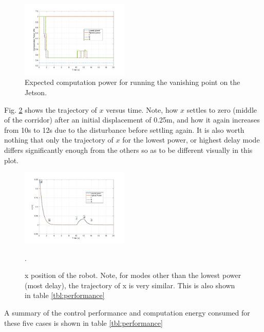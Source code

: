 \begin{figure}[hbtp]
\centering
\includegraphics[width=0.46\textwidth]{../simulations/figs/power.pdf}
\caption{Expected computation power for running the vanishing point on the Jetson.}
\label{fig:power} 
\end{figure}

Fig. \ref{fig:xvst} shows the trajectory of $x$ versus time. Note, how $x$ settles to zero (middle of the corridor) after an initial displacement of 0.25m, and how it again increases from 10s to 12s due to the disturbance before settling again. It is also worth nothing that only the trajectory of $x$ for the lowest power, or highest delay mode differs significantly enough from the others so as to be different visually in this plot.


\begin{figure}[hbtp]
\centering
\includegraphics[width=0.46\textwidth]{../simulations/figs/xvst.pdf}
\caption{x position of the robot. Note, for modes other than the lowest power (most delay), the trajectory of x is very similar. This is also shown in table \ref{tbl:performance}}.
\label{fig:xvst} 
\end{figure}

A summary of the control performance and computation energy consumed for these five cases is shown in table \ref{tbl:performance}

